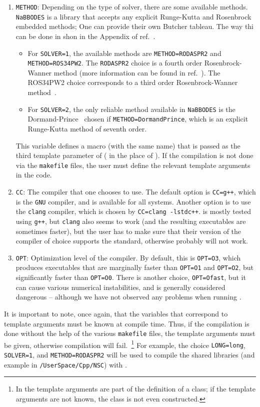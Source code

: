\documentclass[11pt,a4paper]{article}
\begin{document}
\begin{enumerate}
	\item {\tt METHOD}: Depending on the type of solver, there are some available methods.  {\tt NaBBODES} is a library that accepts any explicit Runge-Kutta and Rosenbrock embedded methods; One can provide their own Butcher tableau. The way thi can be done in shon in the Appendix of ref.~\cite{Karamitros:2021nxi}.  
	\begin{itemize}
		\item 	For {\tt SOLVER=1}, the available methods are 
		{\tt METHOD=RODASPR2} and {\tt METHOD=ROS34PW2}. The {\tt RODASPR2} choice is a fourth order Rosenbrock-Wanner method (more information can be found in ref.~\cite{RANG2015128}). The {ROS34PW2} choice corresponds to a third order Rosenbrock-Wanner method~\cite{RangAngermann2005}. 
		\item 	For {\tt SOLVER=2}, the only reliable method available in {\tt NaBBODES} is the Dormand-Prince~\cite{DORMAND198019} chosen if {\tt METHOD=DormandPrince}, which is an explicit Runge-Kutta method of seventh order.
	\end{itemize}
	This variable defines a macro (with the same name) that is passed as the third template parameter of  (\ie {} in the place of ). 
	If the compilation is not done via the {\tt makefile} files, the user must define the relevant template arguments in the code.
	\item {\tt CC}: The \CPP compiler that one chooses to use. The default option is {\tt CC=g++}, which is the {\tt GNU} \CPP compiler, and is available for all systems. Another option is to use the {\tt clang} compiler, which is chosen by {\tt CC=clang -lstdc++}. \nsc is mostly tested using {\tt g++}, but {\tt clang} also seems to work (and the resulting executables are sometimes faster), but the user has to make sure that their version of the compiler of choice supports the  standard, otherwise \nsc probably will not work.
	\item {\tt OPT}: Optimization level of the compiler. By default, this is {\tt OPT=O3}, which produces executables that are marginally faster than {\tt OPT=O1} and {\tt OPT=O2}, but significantly faster than {\tt OPT=O0}. There is another choice, {\tt OPT=Ofast}, but it can cause various numerical instabilities, and is generally considered dangerous -- although we have not observed any problems when running \nsc. 
\end{enumerate}
%
It is important to note, once again, that the variables that correspond to template arguments must be known at compile time. Thus, if the compilation is done without the help of the various {\tt makefile} files, the template arguments must be given, otherwise compilation will fail.~\footnote{In \CPP the template arguments are part of the definition of a class; if the template arguments are not known, the class is not even constructed.} For example, the choice {\tt LONG=long}, {\tt SOLVER=1}, and {\tt METHOD=RODASPR2} will be used to compile the shared libraries (and \CPP example in {\tt \nsc/UserSpace/Cpp/NSC}) with . 
\end{document}
